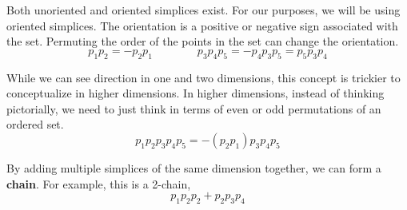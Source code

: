 Both unoriented and oriented simplices exist.  For our purposes, we will be using oriented simplices.  The orientation is a positive or negative sign associated with the set.  Permuting the order of the points in the set can change the orientation.
\begin{equation}
  p_1 p_2 = - p_2 p_1 \qquad \qquad p_3 p_4 p_5 = - p_4 p_3 p_5 = p_5 p_3 p_4
\end{equation}
\begin{center}
\end{center}
While we can see direction in one and two dimensions, this concept is trickier to conceptualize in higher dimensions.  In higher dimensions, instead of thinking pictorially, we need to just think in terms of even or odd permutations of an ordered set.
\begin{equation}
  p_1 p_2 p_3 p_4 p_5 = - (p_2 p_1) p_3 p_4 p_5
\end{equation}

By adding multiple simplices of the same dimension together, we can form a \textbf{chain}.  For example, this is a 2-chain,
\begin{equation}
  p_1 p_2 p_2 + p_2 p_3 p_4
\end{equation}
\begin{center}
\end{center}

